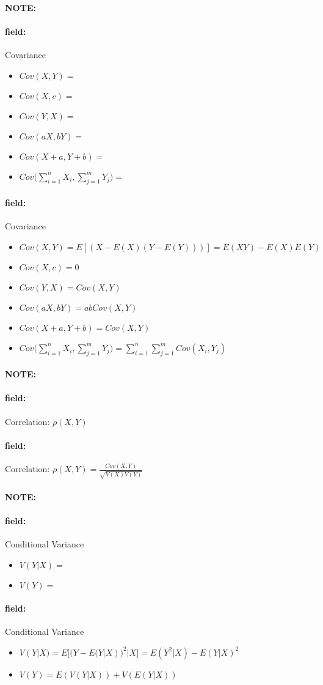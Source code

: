 \documentclass[12pt]{article}
\newenvironment{note}{\paragraph{NOTE:}}{}
\newenvironment{field}{\paragraph{field:}}{}
\begin{document}
\begin{note}
  \begin{field}
    Covariance
    \begin{itemize}
      \item $Cov(X,Y) = $
      \item $Cov(X,c) = $
      \item $Cov(Y,X) = $
      \item $Cov(aX,bY) =$
      \item $Cov(X + a, Y + b) =$
      \item $Cov\bigg(\sum_{i=1}^n X_i, \sum_{j=1}^m Y_j\bigg) = $
    \end{itemize}
  \end{field}
  \begin{field}
    Covariance
    \begin{itemize}
      \item $Cov(X,Y) = E[(X - E(X)(Y - E(Y)))] = E(XY) - E(X)E(Y)$
      \item $Cov(X,c) = 0$
      \item $Cov(Y,X) = Cov(X,Y)$
      \item $Cov(aX,bY) = abCov(X,Y)$
      \item $Cov(X + a, Y + b) = Cov(X,Y)$
      \item $Cov\bigg(\sum_{i=1}^n X_i, \sum_{j=1}^m Y_j\bigg) = \sum_{i=1}^n \sum_{j=1}^m Cov(X_i,Y_j)$
    \end{itemize}
  \end{field}
\end{note}

\begin{note}
  \begin{field}
    Correlation: $\rho(X,Y)$
  \end{field}
  \begin{field}
    Correlation: $\rho(X,Y) = \frac{Cov(X,Y)}{\sqrt{V(X)V(Y)}}$
  \end{field}
\end{note}



\begin{note}
  \begin{field}
    Conditional Variance
    \begin{itemize}
      \item $V(Y|X) = $
      \item $V(Y) = $
    \end{itemize}
  \end{field}
  \begin{field}
    Conditional Variance
    \begin{itemize}
      \item $V(Y|X) = E\big[(Y - E(Y|X))^2|X\big] = E(Y^2|X) - E(Y|X)^2$
      \item $V(Y) = E(V(Y|X)) + V(E(Y|X))$
    \end{itemize}
  \end{field}
\end{note}
\end{document}
